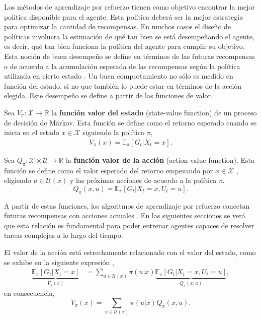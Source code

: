 Los métodos de aprendizaje por refuerzo tienen como objetivo encontrar la mejor política disponible para el agente. Esta política deberá ser la mejor estrategia para optimizar la cantidad de recompensas. En muchos casos el diseño de políticas involucra la estimación de qué tan bien se está desempeñando el agente, es decir, qué tan bien funciona la política del agente para cumplir su objetivo. Esta noción de buen desempeño se define en términos de las futuras recompensas o de acuerdo a la acumulación esperada de las recompensas según la política utilizada en cierto estado \cite{Sutton2018}. Un buen comportamiento no sólo es medido en función del estado, si no que también lo puede estar en términos de la acción elegida. Este desempeño se define a partir de las funciones de valor. 

\begin{definition}
    Sea $V_{\pi}: \mathcal{X} \rightarrow \mathbb{R}$ la \textbf{función valor del estado} (state-value function) de un proceso de decisión de Márkov. Esta función se define como el retorno esperado cuando se inicia en el estado $x \in \mathcal{X}$ siguiendo la política $\pi$,
    \begin{align*}
        V_{\pi}(x)= \mathbb{E}_{\pi}\left[G_t | X_t=x\right].
    \end{align*}

    Sea $Q_{\pi}: \mathcal{X}\times\mathcal{U}\rightarrow \mathbb{R}$ la \textbf{función valor de la acción} (action-value function).
    Esta función se define como el valor esperado del retorno empezando por $x\in \mathcal{X}$ , eligiendo $u \in \mathcal{U}(x)$ y las próximas acciones de acuerdo a la política $\pi$. 
    $$Q_{\pi}(x, u)= \mathbb{E}_{\pi}\left[G_t | X_t=x, U_t=u\right].$$
\end{definition}

A partir de estas funciones, los algoritmos de aprendizaje por refuerzo conectan futuras recompensas con acciones actuales \cite{prince2023understanding}. En las siguientes secciones se verá que esta relación es fundamental para poder entrenar agentes capaces de resolver tareas complejas a lo largo del tiempo. 

\begin{remark}
    El valor de la acción está estrechamente relacionado con el valor del estado, como se exhibe en la siguiente expresión \cite{Sutton2018},
    \begin{align*}
        \underbrace{\mathbb{E}_{\pi}[G_t|X_t=x]}_{V_{\pi}(x)} &= \sum_{u\in\mathcal{U}(x)}\pi(u|x)\underbrace{\mathbb{E}_{\pi}[G_t|X_t=x, U_t=u]}_{Q_{\pi}(x,u)},
    \end{align*}
    en consecuencia, 
    $$V_{\pi}(x) = \sum_{u\in \mathcal{U}(x)}\pi(u|x)Q_{\pi}(x, u).$$
    \label{obs:v_q_relationship}
\end{remark}

